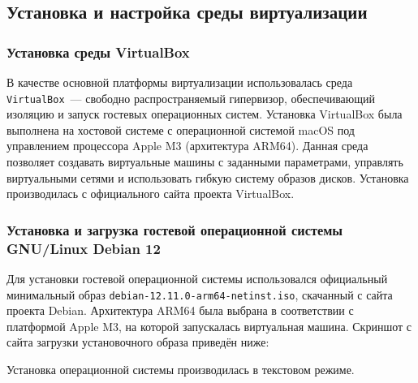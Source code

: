 \subsection{Установка и настройка среды виртуализации}

\subsubsection{Установка среды VirtualBox}

В качестве основной платформы виртуализации использовалась среда \texttt{VirtualBox}~--- свободно распространяемый гипервизор, обеспечивающий изоляцию и запуск гостевых операционных систем. Установка VirtualBox была выполнена на хостовой системе с операционной системой macOS под управлением процессора Apple M3 (архитектура ARM64). Данная среда позволяет создавать виртуальные машины с заданными параметрами, управлять виртуальными сетями и использовать гибкую систему образов дисков. Установка производилась с официального сайта проекта VirtualBox.

\subsubsection{Установка и загрузка гостевой операционной системы GNU/Linux Debian 12}

Для установки гостевой операционной системы использовался официальный минимальный образ \texttt{debian-12.11.0-arm64-netinst.iso}, скачанный с сайта проекта Debian. Архитектура ARM64 была выбрана в соответствии с платформой Apple M3, на которой запускалась виртуальная машина. Скриншот с сайта загрузки установочного образа приведён ниже:


Установка операционной системы производилась в текстовом режиме.

